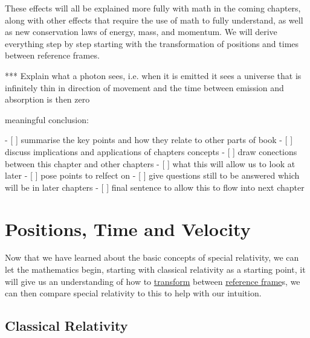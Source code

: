 These effects will all be explained more fully with math in the coming chapters, along with other effects that require the use of math to fully understand, as well as new conservation laws of energy, mass, and momentum. We will derive everything step by step starting with the transformation of positions and times between reference frames.

*** Explain what a photon sees, i.e. when it is emitted it sees a universe that is infinitely thin in direction of movement and the time between emission and absorption is then zero

meaningful conclusion:

- [ ] summarise the key points and how they relate to other parts of book
- [ ] discuss implications and applications of chapters concepts
- [ ] draw conections between this chapter and other chapters
    - [ ] what this will allow us to look at later
- [ ] pose points to relfect on
- [ ] give questions still to be answered which will be in later chapters
- [ ] final sentence to allow this to flow into next chapter



\chapter{Positions, Time and Velocity} %

Now that we have learned about the basic concepts of special relativity, we can let the mathematics begin, starting with classical relativity as a starting point, it will give us an understanding of how to \hyperlink{def-transform}{transform} between \hyperlink{def-Reference-frame}{reference frame}s, we can then compare special relativity to this to help with our intuition.

\section{Classical Relativity}


